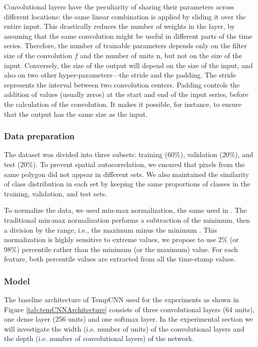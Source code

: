 Convolutional layers have the peculiarity of sharing their parameters across different locations: the same linear combination is applied by sliding it over the entire input.
This drastically reduces the number of weights in the layer, by assuming that the same convolution might be useful in different parts of the time series.
Therefore, the number of trainable parameters depends only on the filter size of the convolution $f$ and the number of units n, but not on the size of the input.
Conversely, the size of the output will depend on the size of the input, and also on two other hyper-parameters—the stride and the padding.
The stride represents the interval between two convolution centers.
Padding controls the addition of values (usually zeros) at the start and end of the input series, before the calculation of the convolution.
It makes it possible, for instance, to ensure that the output has the same size as the input.

\subsubsection{Data preparation}

The dataset was divided into three subsets: training (60\%), validation (20\%), and test (20\%).
To prevent spatial autocorrelation, we ensured that pixels from the same polygon did not appear in different sets.
We also maintained the similarity of class distribution in each set by keeping the same proportions of classes in the training, validation, and test sets.

To normalize the data, we used min-max normalization, the same used in \cite{tempCNN}.
The traditional min-max normalization performs a subtraction of the minimum, then a division by the range, i.e., the maximum minus the minimum \cite{han2011data}.
This normalization is highly sensitive to extreme values, we propose to use 2\% (or 98\%) percentile rather than the minimum (or the maximum) value. 
For each feature, both percentile values are extracted from all the time-stamp values.


\subsubsection{Model}

The baseline architecture of TempCNN used for the experiments as shown in Figure \ref{tab:temCNNArchitecture} consists of three convolutional layers (64 units), one dense layer (256 units) and one softmax layer.
In the experimental section we will investigate the width (i.e. number of units) of the convolutional layers and the depth (i.e. number of convolutional layers) of the network.

